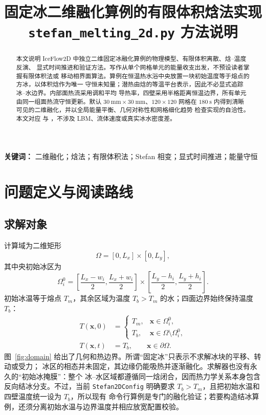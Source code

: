 \documentclass[UTF8,11pt]{ctexart}
\title{固定冰二维融化算例的有限体积焓法实现\\
\large \texttt{stefan\_melting\_2d.py} 方法说明}
\author{}
\date{}
\numberwithin{equation}{section}
\newcommand{\code}[1]{\texttt{#1}}
\begin{document}
\maketitle

\begin{abstract}
本文说明 IceFlow2D 中独立二维固定冰融化算例的物理模型、有限体积离散、焓--温度反演、
显式时间推进和验证方法。写作从单个网格单元的能量收支出发，不预设读者掌握有限体积法或
移动相界面算法。算例在恒温热水浴中央放置一块初始温度等于熔点的方冰，以体积焓作为唯一
守恒未知量；潜热由焓的等温平台表示，因此不必显式追踪冰--水边界。内部面热流采用调和平均
导热率，四壁采用半格距离恒温边界，所有单元由同一组面热流守恒更新。默认
$\SI{30}{\milli\metre}\times\SI{30}{\milli\metre}$、$120\times120$ 网格在
$\SI{180}{\second}$ 内得到清晰可见的二维融化，并以全局能量平衡、几何对称性和网格细化趋势
检查实现的自洽性。本文对应  与
，不涉及 LBM、流体速度或真实冰水密度差。
\end{abstract}

\noindent\textbf{关键词：} 二维融化；焓法；有限体积法；Stefan 相变；显式时间推进；能量守恒

\section{问题定义与阅读路线}

\subsection{求解对象}

计算域为二维矩形
\begin{equation}
      \Omega=[0,L_x]\times[0,L_y],
      \label{eq:domain}
\end{equation}
其中央初始冰区为
\begin{equation}
      \Omega_i^0=
      \left[\frac{L_x-w_i}{2},\frac{L_x+w_i}{2}\right]
      \times
      \left[\frac{L_y-h_i}{2},\frac{L_y+h_i}{2}\right].
      \label{eq:initial-ice-domain}
\end{equation}
初始冰温等于熔点 $T_m$，其余区域为温度 $T_b>T_m$ 的水；四面边界始终保持温度
$T_b$：
\begin{align}
      T(\bm x,0)&=
      \begin{cases}
            T_m, & \bm x\in\Omega_i^0,\\
            T_b, & \bm x\in\Omega\setminus\Omega_i^0,
      \end{cases}
      \label{eq:initial-temperature}\\
      T(\bm x,t)&=T_b,
      \qquad \bm x\in\partial\Omega.
      \label{eq:boundary-temperature}
\end{align}
图~\ref{fig:domain} 给出了几何和热边界。所谓“固定冰”只表示不求解冰块的平移、转动或受力；
冰区的相态并未固定，其边缘仍能吸热并逐渐融化。求解器也没有永久的“初始冰掩膜”：整个
冰--水区域都遵循同一焓闭合，因而热力学关系本身包含反向结冰分支。不过，当前
\code{Stefan2DConfig} 明确要求 $T_b>T_m$，且把初始水温和四壁温度统一设为 $T_b$，所以现有
命令行算例是专门的融化验证；若要构造结冰算例，还须分离初始水温与边界温度并相应放宽配置校验。
\end{document}

